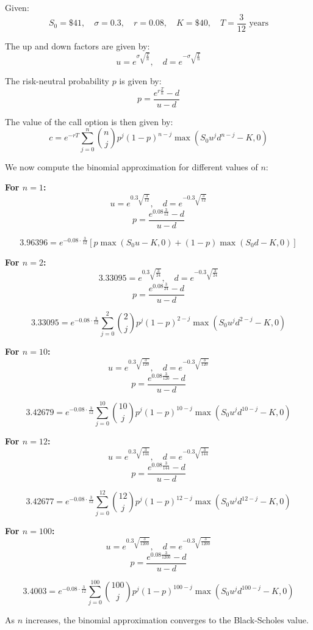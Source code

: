 \documentclass{article}
\begin{document}
Given:
\[
S_0 = \$41, \quad \sigma = 0.3, \quad r = 0.08, \quad K = \$40, \quad T = \frac{3}{12} \text{ years}
\]

The up and down factors are given by:
\[
u = e^{\sigma \sqrt{\frac{T}{n}}}, \quad d = e^{-\sigma \sqrt{\frac{T}{n}}}
\]

The risk-neutral probability \( p \) is given by:
\[
p = \frac{e^{r \frac{T}{n}} - d}{u - d}
\]

The value of the call option is then given by:
\[
c = e^{-rT} \sum_{j=0}^{n} \binom{n}{j} p^j (1-p)^{n-j} \max(S_0 u^j d^{n-j} - K, 0)
\]

We now compute the binomial approximation for different values of \( n \):

\textbf{For \( n = 1 \):}
\[
u = e^{0.3 \sqrt{\frac{3}{12}}}, \quad d = e^{-0.3 \sqrt{\frac{3}{12}}}
\]
\[
p = \frac{e^{0.08 \frac{3}{12}} - d}{u - d}
\]

\[
3.96396 = e^{-0.08 \cdot \frac{3}{12}} \left[ p \max(S_0 u - K, 0) + (1 - p) \max(S_0 d - K, 0) \right]
\]

\textbf{For \( n = 2 \):}
\[
3.33095 = e^{0.3 \sqrt{\frac{3}{24}}}, \quad d = e^{-0.3 \sqrt{\frac{3}{24}}}
\]
\[
p = \frac{e^{0.08 \frac{3}{24}} - d}{u - d}
\]

\[
3.33095 = e^{-0.08 \cdot \frac{3}{12}} \sum_{j=0}^{2} \binom{2}{j} p^j (1-p)^{2-j} \max(S_0 u^j d^{2-j} - K, 0)
\]

\textbf{For \( n = 10 \):}
\[
u = e^{0.3 \sqrt{\frac{3}{120}}}, \quad d = e^{-0.3 \sqrt{\frac{3}{120}}}
\]
\[
p = \frac{e^{0.08 \frac{3}{120}} - d}{u - d}
\]

\[
3.42679 = e^{-0.08 \cdot \frac{3}{12}} \sum_{j=0}^{10} \binom{10}{j} p^j (1-p)^{10-j} \max(S_0 u^j d^{10-j} - K, 0)
\]

\textbf{For \( n = 12 \):}
\[
u = e^{0.3 \sqrt{\frac{3}{144}}}, \quad d = e^{-0.3 \sqrt{\frac{3}{144}}}
\]
\[
p = \frac{e^{0.08 \frac{3}{144}} - d}{u - d}
\]

\[
3.42677 = e^{-0.08 \cdot \frac{3}{12}} \sum_{j=0}^{12} \binom{12}{j} p^j (1-p)^{12-j} \max(S_0 u^j d^{12-j} - K, 0)
\]

\textbf{For \( n = 100 \):}
\[
u = e^{0.3 \sqrt{\frac{3}{1200}}}, \quad d = e^{-0.3 \sqrt{\frac{3}{1200}}}
\]
\[
p = \frac{e^{0.08 \frac{3}{1200}} - d}{u - d}
\]

\[
3.4003 = e^{-0.08 \cdot \frac{3}{12}} \sum_{j=0}^{100} \binom{100}{j} p^j (1-p)^{100-j} \max(S_0 u^j d^{100-j} - K, 0)
\]

As \( n \) increases, the binomial approximation converges to the Black-Scholes value. 
\end{document}
